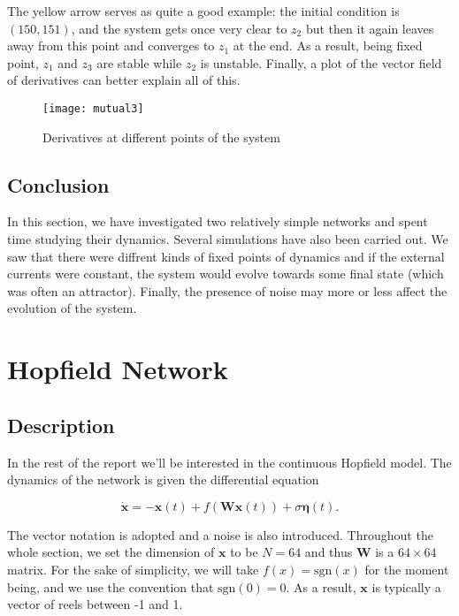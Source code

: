 The yellow arrow serves as quite a good example: the initial condition is 
$(150, 151)$, and the system gets once very clear to $z_2$ but then it again
leaves away from this point and converges to $z_1$ at the end. As a result,
being fixed point, $z_1$ and $z_3$ are stable while $z_2$ is unstable. 
Finally, a plot of the vector field of derivatives can better 
explain all of this.

\begin{figure}[H]
  \centering
  \texttt{[image: mutual3]}
  \caption{Derivatives at different points of the system}
\end{figure}

\subsection{Conclusion}

In this section, we have investigated two relatively simple networks and spent
time studying their dynamics. Several simulations have also been carried out.
We saw that there were diffrent kinds of fixed points of dynamics and if the
external currents were constant, the system would evolve towards some final 
state (which was often an attractor). Finally, the presence of noise may more
or less affect the evolution of the system.


\section{Hopfield Network}

\subsection{Description}

In the rest of the report we'll be interested in the continuous Hopfield 
model. The dynamics of the network is given the differential equation

\[\dot{\mathbf{x}} = -\mathbf{x}(t) + f(\mathbf{Wx}(t)) + 
  \sigma\mathbf{\eta}(t).\]

\noindent
The vector notation is adopted and a noise is also introduced.
Throughout the whole section, we set the dimension of $\mathbf{x}$ to be 
$N=64$ and thus $\mathbf{W}$ is a $64\times64$ matrix. For the sake of 
simplicity, we will take $f(x) = \mathrm{sgn}(x)$ for the moment being, and 
we use the convention that $\mathrm{sgn}(0) = 0$. As a result, $\mathbf{x}$
is typically a vector of reels between -1 and 1.

